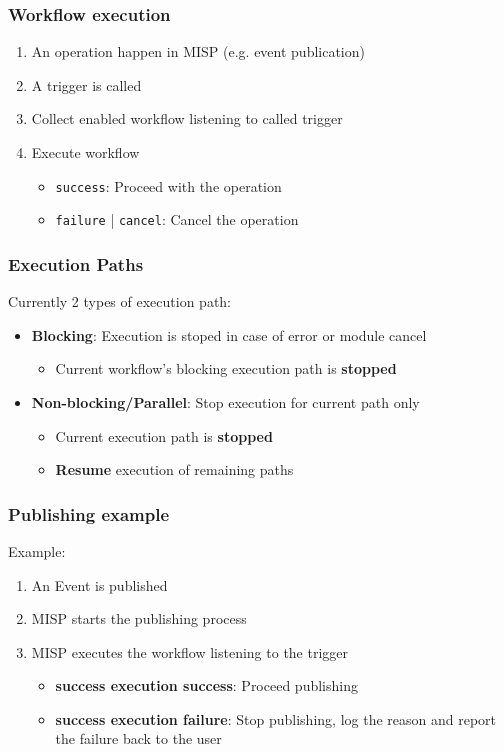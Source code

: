 \begin{frame}
    \frametitle{Workflow execution}
    \begin{enumerate}
        \item An operation happen in MISP (e.g. event publication)
        \item A trigger is called
        \item Collect enabled workflow listening to called trigger
        \item Execute workflow
        \begin{itemize}
            \item \texttt{\color{green!50!black}success}: Proceed with the operation
            \item \texttt{\color{red}failure} | \texttt{\color{blue}cancel}: Cancel the operation
        \end{itemize}
    \end{enumerate}
\end{frame}

\begin{frame}
    \frametitle{Execution Paths}
    Currently 2 types of execution path:
    \vspace{0.5em}
    \begin{itemize}
        \item {\bf Blocking}: Execution is stoped in case of error or module cancel
        \begin{itemize}
            \item Current workflow's blocking execution path is {\bf stopped}
        \end{itemize}
        \vspace{0.5em}
        \item {\bf Non-blocking/Parallel}: Stop execution for current path only
        \begin{itemize}
            \item Current execution path is {\bf stopped}
            \item {\bf Resume} execution of remaining paths
        \end{itemize}
    \end{itemize}
\end{frame}

\begin{frame}
    \frametitle{Publishing example}
    Example:
    \begin{enumerate}
        \item An Event is published
        \item MISP starts the publishing process
        \item MISP executes the workflow listening to the trigger
        \begin{itemize}
            \item {\bf\color{green!50!black}success execution success}: Proceed publishing
            \item {\bf\color{red}success execution failure}: Stop publishing, log the reason and report the failure back to the user
        \end{itemize}
    \end{enumerate}
\end{frame}

